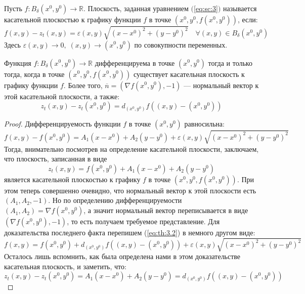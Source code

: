 \documentclass[11pt]{article}
\begin{document}
\begin{definition}
    Пусть $f \colon B_{\delta}\left(x^0, y^0\right) \to \mathbb{R}$. Плоскость, заданная 
    уравнением $($\ref{eq:sc:3}$)$ называется касательной плоскостью к графику функции $f$ в точке $\left(x^0, y^0, f\left(x^0, y^0\right)\right)$, если:
    \[f(x, y) - z_t(x, y) = \varepsilon(x, y) \sqrt{\left(x - x^0\right)^2 + \left(y - y^0\right)^2} \quad \forall (x, y) \in B_{\delta}(x^0, y^0)\]
    Здесь $\varepsilon(x, y) \to 0, \; (x, y) \to \left(x^0, y^0\right)$ по совокупности переменных.
\end{definition}

\begin{theorem}
    Функция $f \colon B_{\delta}\left(x^0, y^0\right) \to \mathbb{R}$ дифференцируема в точке $\left(x^0, y^0\right)$ тогда 
    и только тогда, когда в точке $\left(x^0, y^0, f\left(x^0, y^0\right)\right)$ существует касательная плоскость к графику 
    функции $f$. Более того, $\overline{n} = \left(\nabla f\left(x^0, y^0\right), -1\right)$ --- нормальный вектор к этой 
    касательной плоскости, а также:
    \[z_t\left(x, y\right) - z_t\left(x^0, y^0\right) = d_{\left(x^0, y^0\right)} f\left(\left(x, y\right) - \left(x^0, y^0\right)\right)\]
\end{theorem}

\begin{proof}
    Дифференцируемость функции $f$ в точке $\left(x^0, y^0\right)$ равносильна:
    \begin{equation*} \label{eq:th:3.2} \tag{$\star \star$}
        f\left(x, y\right) - f\left(x^0, y^0\right) = A_1 \left(x - x^0\right) + A_2 \left(y - y^0\right) + \varepsilon(x, y) \sqrt{\left(x - x^0 \right)^2 + \left(y - y^0\right)^2}
    \end{equation*}
    Тогда, внимательно посмотрев на определение касательной плоскости, заключаем, что плоскость, записанная в виде 
    \[z_t(x, y) = f \left(x^0, y^0\right) + A_1 \left(x - x^0\right) + A_2 \left(y - y^0\right)\]
    является касательной плоскостью к графику $f$ в точке $\left(x^0, y^0, f\left(x^0, y^0\right)\right)$. При этом теперь совершенно очевидно, что 
    нормальный вектор к этой плоскости есть $\left(A_1, A_2, -1\right)$. Но по определению дифференцируемости $\left(A_1, A_2\right) = \nabla f \left(x^0, y^0\right)$, а значит 
    нормальный вектор переписывается в виде $\left(\nabla f\left(x^0, y^0\right), -1\right)$, то есть получаем требуемое представление. Для доказательства 
    последнего факта перепишем (\ref{eq:th:3.2}) в немного другом виде:
    \[f\left(x, y\right) = f\left(x^0, y^0\right) + d_{\left(x^0, y^0\right)} f \left(\left(x, y\right) - \left(x^0, y^0\right)\right) + \varepsilon(x, y) \sqrt{\left(x - x^0 \right)^2 + \left(y - y^0\right)^2}\]
    Осталось лишь вспомнить, как была определена нами в этом доказательстве касательная плоскость, и заметить, что:
    \[z_t\left(x, y\right) - z_t\left(x^0, y^0\right) = A_1 \left(x - x^0\right) + A_2 \left(y - y^0\right) =  d_{\left(x^0, y^0\right)} f\left(\left(x, y\right) - \left(x^0, y^0\right)\right)\]
\end{proof}
\end{document}

